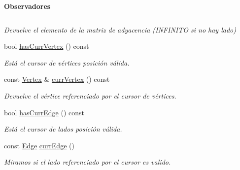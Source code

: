 \begin{Indent}{\bf Observadores}
\begin{DoxyCompactItemize}
$$\begin{DoxyCompactList}\small\item\em Devuelve el elemento de la matriz de adyacencia (I\+N\+F\+I\+N\+I\+T\+O si no hay lado) \end{DoxyCompactList}\item 
bool \hyperlink{classedi_1_1GraphMatrix_afa8535e20eca6a765399e2d18859cd97}{has\+Curr\+Vertex} () const 
\begin{DoxyCompactList}\small\item\em Está el cursor de vértices posición válida. \end{DoxyCompactList}\item 
const \hyperlink{classedi_1_1Vertex}{Vertex} \& \hyperlink{classedi_1_1GraphMatrix_a3e1ebb6cfd5bafafd05cd94b9cf12b54}{curr\+Vertex} () const 
\begin{DoxyCompactList}\small\item\em Devuelve el vértice referenciado por el cursor de vértices. \end{DoxyCompactList}\item 
bool \hyperlink{classedi_1_1GraphMatrix_a0edc09b18604d94eb4692cbff0d4ce2a}{has\+Curr\+Edge} () const 
\begin{DoxyCompactList}\small\item\em Está el cursor de lados posición válida. \end{DoxyCompactList}\item 
const \hyperlink{classedi_1_1Edge}{Edge} \hyperlink{classedi_1_1GraphMatrix_ada0a9c50e87493338527baab50600501}{curr\+Edge} ()
\begin{DoxyCompactList}\small\item\em Miramos si el lado referenciado por el cursor es valido. \end{DoxyCompactList}\end{DoxyCompactItemize}
\end{Indent}
